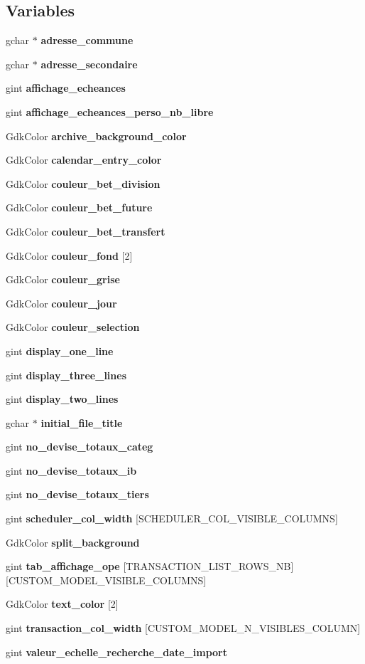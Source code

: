 \subsection*{Variables}
\begin{DoxyCompactItemize}
\item 
gchar $\ast$ {\bf adresse\_\-commune}
\item 
gchar $\ast$ {\bf adresse\_\-secondaire}
\item 
gint {\bf affichage\_\-echeances}
\item 
gint {\bf affichage\_\-echeances\_\-perso\_\-nb\_\-libre}
\item 
GdkColor {\bf archive\_\-background\_\-color}
\item 
GdkColor {\bf calendar\_\-entry\_\-color}
\item 
GdkColor {\bf couleur\_\-bet\_\-division}
\item 
GdkColor {\bf couleur\_\-bet\_\-future}
\item 
GdkColor {\bf couleur\_\-bet\_\-transfert}
\item 
GdkColor {\bf couleur\_\-fond} [2]
\item 
GdkColor {\bf couleur\_\-grise}
\item 
GdkColor {\bf couleur\_\-jour}
\item 
GdkColor {\bf couleur\_\-selection}
\item 
gint {\bf display\_\-one\_\-line}
\item 
gint {\bf display\_\-three\_\-lines}
\item 
gint {\bf display\_\-two\_\-lines}
\item 
gchar $\ast$ {\bf initial\_\-file\_\-title}
\item 
gint {\bf no\_\-devise\_\-totaux\_\-categ}
\item 
gint {\bf no\_\-devise\_\-totaux\_\-ib}
\item 
gint {\bf no\_\-devise\_\-totaux\_\-tiers}
\item 
gint {\bf scheduler\_\-col\_\-width} [SCHEDULER\_\-COL\_\-VISIBLE\_\-COLUMNS]
\item 
GdkColor {\bf split\_\-background}
\item 
gint {\bf tab\_\-affichage\_\-ope} [TRANSACTION\_\-LIST\_\-ROWS\_\-NB][CUSTOM\_\-MODEL\_\-VISIBLE\_\-COLUMNS]
\item 
GdkColor {\bf text\_\-color} [2]
\item 
gint {\bf transaction\_\-col\_\-width} [CUSTOM\_\-MODEL\_\-N\_\-VISIBLES\_\-COLUMN]
\item 
gint {\bf valeur\_\-echelle\_\-recherche\_\-date\_\-import}
\end{DoxyCompactItemize}


